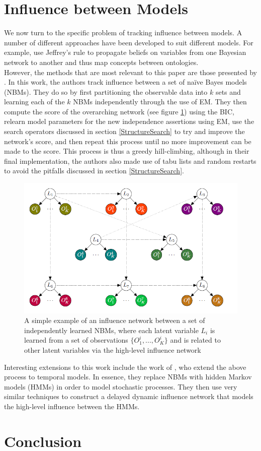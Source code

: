 \documentclass [11pt]{article}
\begin{document}
\section{Influence between Models}\label{InfluenceBetweenModels}
We now turn to the specific problem of tracking influence between models. A number of different approaches have been developed to suit different models. For example, \cite{Pan05} use Jeffrey's rule \citep{pearl90} to propagate beliefs on variables from one Bayesian network to another and thus map concepts between ontologies. 
\\
However, the methods that are most relevant to this paper are those presented by \cite{ajoodha17}. In this work, the authors track influence between a set of na\"{i}ve Bayes models (NBMs). They do so by first partitioning the observable data into $k$ sets and learning each of the $k$ NBMs independently through the use of EM. They then compute the score of the overarching network (see figure \ref{fig:ajoodha}) using the BIC, relearn model parameters for the new independence assertions using EM, use the search operators discussed in section \ref{StructureSearch} to try and improve the network's score, and then repeat this process until no more improvement can be made to the score. This process is thus a greedy hill-climbing, although in their final implementation, the authors also made use of tabu lists and random restarts to avoid the pitfalls discussed in section \ref{StructureSearch}.
\begin{figure}[H]\label{fig:ajoodha}
\centering
\caption{A simple example of an influence network between a set of independently learned NBMs, where each latent variable $L_{i}$ is learned from a set of observations $\{O_{1}^{i},...,O_{K}^{i}\}$ and is related to other latent variables via the high-level influence network \citep{ajoodha17}}
\includegraphics[width=12cm]{ajoodha.png}
\end{figure}
Interesting extensions to this work include the work of \cite{ajoodha18}, who extend the above process to temporal models. In essence, they replace NBMs with hidden Markov models (HMMs) in order to model stochastic processes. They then use very similar techniques to construct a delayed dynamic influence network that models the high-level influence between the HMMs.
\section{Conclusion}


\end{document}
